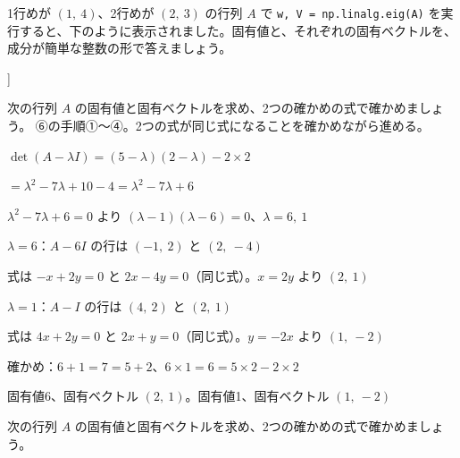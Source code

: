 \begin{jibun}
1行めが $(1,\ 4)$、2行めが $(2,\ 3)$ の行列 $A$ で \texttt{w, V = np.linalg.eig(A)} を実行すると、下のように表示されました。固有値と、それぞれの固有ベクトルを、成分が簡単な整数の形で答えましょう。
\begin{bkcodeout}[実行結果]
[-1.+0.j  5.+0.j]
[[-0.89442719+0.j -0.70710678+0.j]
 [ 0.4472136 +0.j -0.70710678+0.j]]
\end{bkcodeout}
\end{jibun}



\begin{reidai}[特性方程式で固有値と固有ベクトルを求める]
次の行列 $A$ の固有値と固有ベクトルを求め、2つの確かめの式で確かめましょう。
\kangaekata ⑥の手順①〜④。2つの式が同じ式になることを確かめながら進める。\par
\shiki\kviiis{}\zw{} $\det(A-\lambda I)=(5-\lambda)(2-\lambda)-2\times2$\par
\kviiib $=\lambda^2-7\lambda+10-4=\lambda^2-7\lambda+6$\par
\kviiia $\lambda^2-7\lambda+6=0$ より $(\lambda-1)(\lambda-6)=0$、$\lambda=6,\ 1$\par
\kviiia $\lambda=6$：$A-6I$ の行は $(-1,\ 2)$ と $(2,\ -4)$\par
\kviiib 式は $-x+2y=0$ と $2x-4y=0$（同じ式）。$x=2y$ より $(2,\ 1)$\par
\kviiia $\lambda=1$：$A-I$ の行は $(4,\ 2)$ と $(2,\ 1)$\par
\kviiib 式は $4x+2y=0$ と $2x+y=0$（同じ式）。$y=-2x$ より $(1,\ -2)$\par
\kviiia 確かめ：$6+1=7=5+2$、$6\times1=6=5\times2-2\times2$\par
\kotae\kviiis{}\zw{} 固有値6、固有ベクトル $(2,\ 1)$。固有値1、固有ベクトル $(1,\ -2)$
\end{reidai}

\begin{jibun}
次の行列 $A$ の固有値と固有ベクトルを求め、2つの確かめの式で確かめましょう。
\end{jibun}

